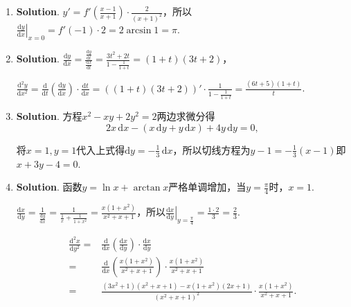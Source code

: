 \documentclass[../Main.tex]{subfiles}
\begin{document}
\begin{enumerate}
    \item \textbf{Solution}. $y'=f'\left(\frac{x-1}{x+1}\right)\cdot\frac{2}{(x+1)^{2}}$，所以$\left
              .\frac{\mathrm{d}y}{\mathrm{d}x}\right|_{x=0}=f'(-1)\cdot 2 =2\arcsin 1=\pi$.

    \item \textbf{Solution}. $\frac{\mathrm{d}y}{\mathrm{d}x}=\frac{\frac{\mathrm{d}y}{\mathrm{d}t}}{\frac{\mathrm{d}x}{\mathrm{d}t}}
              =\frac{3t^{2}+2t}{1-\frac{1}{1+t}}=(1+t)(3t+2)$，

          $\frac{\mathrm{d}^{2}y}{\mathrm{d}x^{2}}=\frac{\mathrm{d}}{\mathrm{d}t}\left
              (\frac{\mathrm{d}y}{\mathrm{d}x}\right)\cdot\frac{\mathrm{d}t}{\mathrm{d}x}
              =\left((1+t)(3t+2)\right)'\cdot\frac{1}{1-\frac{1}{1+t}}=\frac{(6t+5)(1+t)}{t}$.

    \item \textbf{Solution}. 方程$x^{2}-xy+2y^{2}=2$两边求微分得
          \[
              2x\,\mathrm{d}x-(x\,\mathrm{d}y+y\,\mathrm{d}x)+4y\,\mathrm{d}y=0,
          \]

          将$x=1,y=1$代入上式得$\mathrm{d}y=-\frac{1}{3}\,\mathrm{d}x$，所以切线方程为$y
              -1=-\frac{1}{3}(x-1)$即$x+3y-4=0$.

    \item \textbf{Solution}. 函数$y=\ln x+\arctan x$严格单调增加，当$y=\frac{\pi}{4}$时，$x
              =1$.

          $\frac{\mathrm{d}x}{\mathrm{d}y}=\frac{1}{\frac{\mathrm{d}y}{\mathrm{d}x}}=
              \frac{1}{\frac{1}{x}+\frac{1}{1+x^{2}}}=\frac{x(1+x^{2})}{x^{2}+x+1}$，所以$\left
              .\frac{\mathrm{d}x}{\mathrm{d}y}\right|_{y=\frac{\pi}{4}}=\frac{1\cdot 2}{3}
              =\frac{2}{3}$.

          \[
              \begin{aligned}
                  \frac{\mathrm{d}^{2} x}{\mathrm{d}y^{2}}= & \frac{\mathrm{d}}{\mathrm{d}x}\left(\frac{\mathrm{d}x}{\mathrm{d}y}\right)\cdot\frac{\mathrm{d}x}{\mathrm{d}y} \\
                  =                                         & \frac{\mathrm{d}}{\mathrm{d}x}\left(\frac{x(1+x^{2})}{x^{2}+x+1}\right)\cdot\frac{x(1+x^{2})}{x^{2}+x+1}       \\
                  =                                         & \frac{(3x^{2}+1)(x^{2}+x+1)-x(1+x^{2})(2x+1)}{(x^{2}+x+1)^{2}}\cdot\frac{x(1+x^{2})}{x^{2}+x+1}.
              \end{aligned}
          \]


\end{enumerate}
\end{document}

